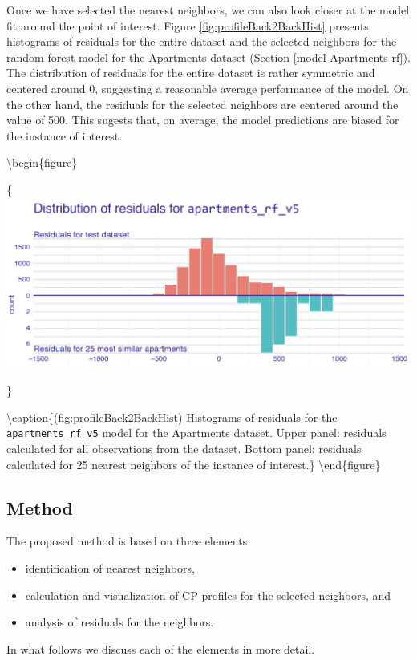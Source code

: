 \documentclass[12pt,]{krantz}
\providecommand{\tightlist}{%
  \setlength{\itemsep}{0pt}\setlength{\parskip}{0pt}}
\begin{document}
Once we have selected the nearest neighbors, we can also look closer at the model fit around the point of interest.
Figure \ref{fig:profileBack2BackHist} presents histograms of residuals for the entire dataset and the selected neighbors for the random forest model for the Apartments dataset (Section \ref{model-Apartments-rf}). The distribution of residuals for the entire dataset is rather symmetric and centered around 0, suggesting a reasonable average performance of the model. On the other hand, the residuals for the selected neighbors are centered around the value of 500. This sugests that, on average, the model predictions are biased for the instance of interest.

\textbackslash{}begin\{figure\}

\{\centering \includegraphics[width=0.7\linewidth]{figure/bb_hist}

\}

\textbackslash{}caption\{(fig:profileBack2BackHist) Histograms of residuals for the \texttt{apartments\_rf\_v5} model for the Apartments dataset. Upper panel: residuals calculated for all observations from the dataset. Bottom panel: residuals calculated for 25 nearest neighbors of the instance of interest.\}\label{fig:profileBack2BackHist}
\textbackslash{}end\{figure\}

\hypertarget{cPLocDiagMethod}{%
\subsection{Method}\label{cPLocDiagMethod}}

The proposed method is based on three elements:

\begin{itemize}
\tightlist
\item
  identification of nearest neighbors,
\item
  calculation and visualization of CP profiles for the selected neighbors, and
\item
  analysis of residuals for the neighbors.
\end{itemize}

In what follows we discuss each of the elements in more detail.
\end{document}
